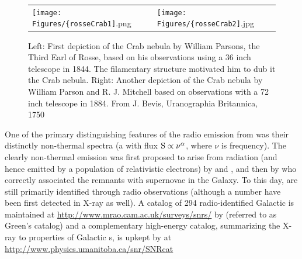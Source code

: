 \begin{figure}[h!]
	\begin{center}
		\begin{tabular}{ll}
			\texttt{[image: Figures/\{rosseCrab1]}.png} &
			\texttt{[image: Figures/\{rosseCrab2]}.jpg} \\
		\end{tabular}
	\end{center}
	\caption[Historical Crab nebula drawings]{
		\label{fig:Crab}{Left: First depiction of the Crab nebula by William Parsons, the Third Earl of Rosse,  based on his observations using a 36 inch telescope in 1844. The filamentary structure motivated him to dub it the Crab nebula. Right: Another depiction of the Crab nebula  by William Parson and R. J. Mitchell based on observations with a 72 inch telescope in 1884. From J. Bevis, Uranographia Britannica, 1750}
	}
\end{figure}
One of the primary distinguishing features of the radio emission from \snrs{} was their distinctly non-thermal spectra (a \pl{} with flux  ${\rm S \propto \nu^\alpha}$, where $\nu$ is frequency). The clearly non-thermal emission was first proposed to arise from \sync{} radiation (and hence emitted by a population of relativistic electrons) by \cite{Kiepenheuer50} and \cite{Alfven50}, and then by \cite{Shklovskii53} who correctly associated the remnants with supernovae in the Galaxy. To this day, \snrs{} are still primarily identified through radio observations (although a number have been first detected in X-ray as well). A catalog of 294 radio-identified Galactic \snrs{} is maintained at \url{http://www.mrao.cam.ac.uk/surveys/snrs/} by \cite{Green14} (referred to as Green's catalog) and a complementary high-energy catalog, summarizing the X-ray to \gam{} properties of Galactic \snr{}s, is upkept by \cite{Ferrand12} at \url{http://www.physics.umanitoba.ca/snr/SNRcat}


